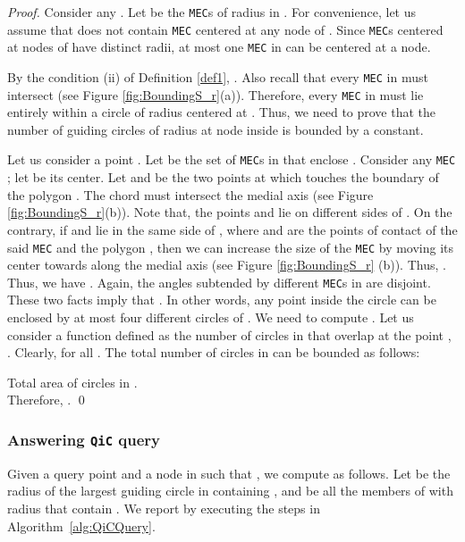 \documentclass[12pt]{llncs}
\begin{document}
\begin{proof}
Consider any . Let  be the {\tt MEC}s of radius  in 
. 
For convenience, let us assume that  does not contain {\tt MEC}  
centered at any node of . Since {\tt MEC}s centered at nodes of  have 
distinct radii, at most one {\tt MEC}  in  can be centered at a node.

By the condition (ii) of Definition \ref{def1}, . Also recall that every 
{\tt MEC} in  must intersect  (see 
Figure \ref{fig:BoundingS_r}(a)). Therefore, every {\tt MEC}  in  must lie 
entirely within a circle  of radius  centered at . Thus, we need 
to prove that the number of guiding circles of radius  at node  inside  is
bounded by a constant.

Let us consider a point . Let  
be the set of {\tt MEC}s in  that enclose . Consider any {\tt MEC}  ; let  be its center. Let  and  be the two points at 
which  touches the boundary of the polygon . The chord  must 
intersect 
the medial axis (see Figure \ref{fig:BoundingS_r}(b)). Note that, the points  and  
lie on different sides of . On the contrary, if  and  lie in 
the same side of , where  and  are the points of contact of the 
said {\tt MEC}  and the polygon , then we can increase the size of the {\tt MEC} by 
moving its center  towards  along the medial axis (see Figure 
\ref{fig:BoundingS_r}
(b)). 
Thus, . Thus, we have . Again, 
the 
angles subtended by different {\tt MEC}s in  are disjoint. These 
two 
facts imply that . In other words, any point inside the circle 
 can be enclosed by at most four different circles of . We need to 
compute . Let us consider a function  defined as the 
number 
of circles in  that overlap at the point , . Clearly, 
 for all . The total number of circles in 
 can be bounded as follows: 

Total area of circles in . \\ 

Therefore, . \qed
\end{proof}

\vspace{-0.15in}
\subsubsection{Answering {\tt QiC} query}
Given a query point  and a node  in  such that , we 
compute 
 as follows. Let  be the radius of the largest guiding circle in
 containing , and  be all the members of  
with radius  that contain .  We report  by executing the steps in Algorithm\ \ref{alg:QiCQuery}. 
\end{document}
